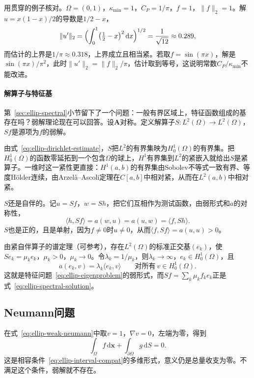 用贯穿的例子核对。$\Omega=(0,1)$，$\kappa_{\min}=1$，$C_P=1/\pi$，$f=1$，$\lVert f\rVert_2=1$。解$u=x(1-x)/2$的导数是$1/2-x$，
\[
 \lVert u'\rVert_2=\Bigl(\int_0^1\bigl(\tfrac12-x\bigr)^2\,\mathrm{d}x\Bigr)^{1/2}=\frac1{\sqrt{12}}\approx0.289,
\]
而估计的上界是$1/\pi\approx0.318$，上界成立且相当紧。若取$f=\sin(\pi x)$，解是$\sin(\pi x)/\pi^2$，此时$\lVert u'\rVert_2=\lVert f\rVert_2/\pi$，估计取到等号，这说明常数$C_P/\kappa_{\min}$不能改进。

\paragraph{解算子与特征基}
第~\ref{sec:ellip-spectral}小节留下了一个问题：一般有界区域上，特征函数组成的基存在吗？弱解理论现在可以回答。设$\bm{A}$对称。定义解算子$S:L^2(\Omega)\to L^2(\Omega)$，$Sf$是源项为$f$的弱解。

由式~\eqref{eq:ellip-dirichlet-estimate}，$S$把$L^2$的有界集映为$H^1_0(\Omega)$的有界集。把$H^1_0(\Omega)$的函数零延拓到一个包含$\Omega$的球上，$H^1$有界集到$L^2$的紧嵌入就给出$S$是紧算子。一维时这一紧性更直接：$H^1(a,b)$的有界集由Sobolev不等式一致有界、等度Hölder连续，由Arzelà--Ascoli定理在$C[a,b]$中相对紧，从而在$L^2(a,b)$中相对紧。

$S$还是自伴的。记$u=Sf$，$w=Sh$，把它们互相作为测试函数，由弱形式和$a$的对称性，
\[
 \langle h,Sf\rangle=a(w,u)=a(u,w)=\langle f,Sh\rangle .
\]
$S$也是正的，且是单射，因为$f\neq0$时$u\neq0$，从而$\langle f,Sf\rangle=a(u,u)>0$。

由紧自伴算子的谱定理（可参考），存在$L^2(\Omega)$的标准正交基$(e_k)$，使$Se_k=\mu_ke_k$，$\mu_k>0$，$\mu_k\to0$。令$\lambda_k=1/\mu_k$，则$\lambda_k\to\infty$，$e_k\in H^1_0(\Omega)$，且
\[
 a(e_k,v)=\lambda_k\langle e_k,v\rangle\qquad\text{对所有}\ v\in H^1_0(\Omega) .
\]
这就是特征问题~\eqref{eq:ellip-eigenproblem}的弱形式，而$Sf=\sum_k\mu_kf_ke_k$正是式~\eqref{eq:ellip-spectral-solution}。

\subsection{Neumann问题}
\label{sec:ellip-neumann}

在式~\eqref{eq:ellip-weak-neumann}中取$v=1$，$\nabla v=0$，左端为零，得到
\begin{equation}
 \int_\Omega f\,\mathrm{d}\bm{x}+\int_{\partial\Omega}g\,\mathrm{d}S=0.
 \label{eq:ellip-neumann-compat}
\end{equation}
这是相容条件~\eqref{eq:ellip-interval-compat}的多维形式，意义仍是总量收支为零。不满足这个条件，弱解就不存在。

